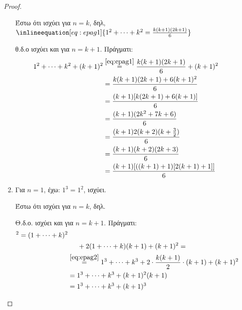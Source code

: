 \documentclass[a4paper,table]{report}
\begin{document}
\begin{multicols}{2}
\begin{enumerate}
\begin{proof}
\begin{enumerate}
            Έστω ότι ισχύει για $n=k$, δηλ, 
            $ \inlineequation[eq:epag1]{1^{2} + \cdots + k^{2} = 
            \frac{k (k+1)(2k+1)}{6}} $

            θ.δ.ο ισχύει και για $ n=k+1 $. Πράγματι:
            \begin{align*}
              1^{2} + \cdots + k^{2} + (k+1)^{2} 
                        &\overset{\eqref{eq:epag1}}{=}\frac{k(k+1)(2k+1)}{6} 
                        + (k+1)^{2} \\
                        &= \frac{k(k+1)(2k+1)+6(k+1)^{2}}{6} \\
                        &= \frac{(k+1)[k(2k+1)+6(k+1)]}{6} \\
                        &= \frac{(k+1)(2k^{2}+7k+6)}{6} \\
                        &= \frac{(k+1)2(k+2)(k+ \frac{3}{2})}{6} \\
                        &= \frac{(k+1)(k+2)(2k+3)}{6} \\
                        &= \frac{(k+1)[((k+1)+1)[2(k+1)+1]]}{6} 
            \end{align*}
          \item Για $ n=1 $, έχω: $ 1^{3} = 1^{2} $, ισχύει.

            Έστω ότι ισχύει για $ n=k $, δηλ. 

            Θ.δ.ο. ισχύει και για $ n=k+1 $. Πράγματι:
            \begin{align*}
              [1+ \cdots &+ k + (k+1)]^{2} 
              = (1+\cdots + k)^{2} \\
                         & \hspace{0.5cm} + 2(1+\cdots + k)(k+1) + (k+1)^{2} = \\
                         &\overset{\eqref{eq:epag2}}{=} 1^{3}+\cdots +k^{3} + 2\cdot 
                         \frac{k(k+1)}{2}\cdot (k+1) + (k+1)^{2} \\
                         &=1^{3}+\cdots +k^{3}+(k+1)^{2}(k+1) \\
                         &= 1^{3}+\cdots +k^{3}+(k+1)^{3}
            \end{align*} 
        \end{enumerate}
      \end{proof}


\end{enumerate}
\end{multicols}
\end{document}
